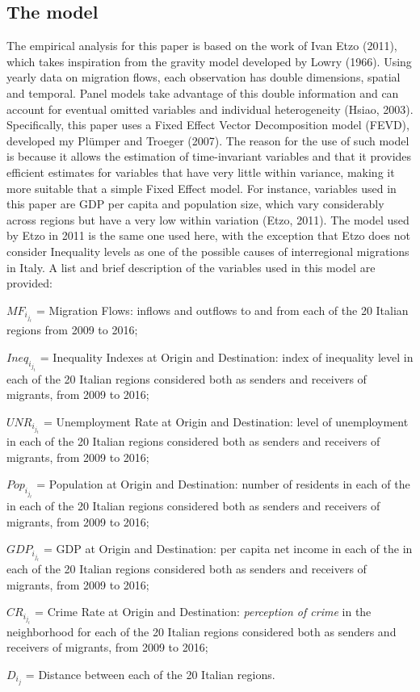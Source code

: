 \documentclass{article}
\theoremstyle{definition}
\theoremstyle{remark}
\begin{document}
\subsection{The model}\label{sec:nothing}
The empirical analysis for this paper is based on the work of Ivan Etzo (2011), which takes inspiration from the gravity model developed by Lowry (1966). Using yearly data on migration flows, each observation has double dimensions, spatial and temporal. Panel models take advantage of this double information and can account for eventual omitted variables and individual heterogeneity (Hsiao, 2003). 
Specifically, this paper uses a Fixed Effect Vector Decomposition model (FEVD), developed my Plümper and Troeger (2007). The reason for the use of such model is because it allows the estimation of time-invariant variables and that it provides efficient estimates for variables that have very little within variance, making it more suitable that a simple Fixed Effect model. For instance, variables used in this paper are GDP per capita and population size, which vary considerably across regions but have a very low within variation (Etzo, 2011). The model used by Etzo in 2011 is the same one used here, with the exception that Etzo does not consider Inequality levels as one of the possible causes of interregional migrations in Italy. A list and brief description of the variables used in this model are provided: 
\vspace{5mm} 
\noindent
\begin{description}
\item  ${MF_i_j_t}$ = Migration Flows: inflows and outflows to and from each of the 20 Italian regions from 2009 to 2016; 
\item  ${Ineq_i_j_t}$ = Inequality Indexes at Origin and Destination: index of inequality level in each of the 20 Italian regions considered both as senders and receivers of migrants, from 2009 to 2016;
\item  ${UNR_i_j_t}$ = Unemployment Rate at Origin and Destination: level of unemployment in each of the 20 Italian regions considered both as senders and receivers of migrants, from 2009 to 2016;
\item  ${Pop_i_j_t}$ = Population at Origin and Destination: number of residents in each of the in each of the 20 Italian regions considered both as senders and receivers of migrants, from 2009 to 2016;
\item  ${GDP_i_j_t}$ = GDP at Origin and Destination: per capita net income in each of the in each of the 20 Italian regions considered both as senders and receivers of migrants, from 2009 to 2016;
\item  ${CR_i_j_t}$ = Crime Rate at Origin and Destination: \textit{perception of crime} in the neighborhood for each of the 20 Italian regions considered both as senders and receivers of migrants, from 2009 to 2016;
\item  ${D_i_j}$ = Distance between each of the 20 Italian regions. 
\end{description}
\end{document}
